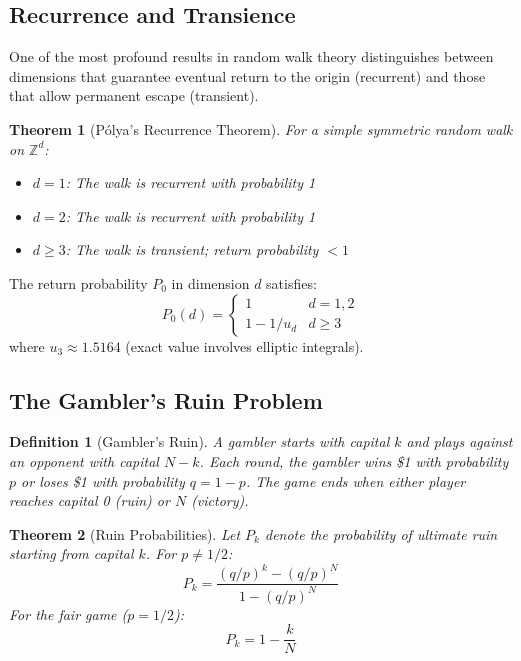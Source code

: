\documentclass[a4paper, 11pt]{article}
\newtheorem{definition}{Definition}[section]
\newtheorem{theorem}{Theorem}[section]
\begin{document}
\subsection{Recurrence and Transience}

One of the most profound results in random walk theory distinguishes between dimensions that
guarantee eventual return to the origin (recurrent) and those that allow permanent escape (transient).

\begin{theorem}[P\'olya's Recurrence Theorem]
For a simple symmetric random walk on $\mathbb{Z}^d$:
\begin{itemize}
\item $d = 1$: The walk is recurrent with probability 1
\item $d = 2$: The walk is recurrent with probability 1
\item $d \geq 3$: The walk is transient; return probability $< 1$
\end{itemize}
\end{theorem}

The return probability $P_0$ in dimension $d$ satisfies:
\begin{equation}
P_0(d) = \begin{cases}
1 & d = 1, 2 \\
1 - 1/u_d & d \geq 3
\end{cases}
\end{equation}
where $u_3 \approx 1.5164$ (exact value involves elliptic integrals).

\subsection{The Gambler's Ruin Problem}

\begin{definition}[Gambler's Ruin]
A gambler starts with capital $k$ and plays against an opponent with capital $N - k$. Each round,
the gambler wins \$1 with probability $p$ or loses \$1 with probability $q = 1 - p$. The game
ends when either player reaches capital 0 (ruin) or $N$ (victory).
\end{definition}

\begin{theorem}[Ruin Probabilities]
Let $P_k$ denote the probability of ultimate ruin starting from capital $k$. For $p \neq 1/2$:
\begin{equation}
P_k = \frac{(q/p)^k - (q/p)^N}{1 - (q/p)^N}
\end{equation}
For the fair game ($p = 1/2$):
\begin{equation}
P_k = 1 - \frac{k}{N}
\end{equation}
\end{theorem}
\end{document}
